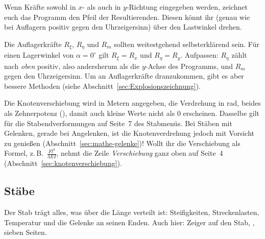 Wenn Kräfte sowohl in $x$- als auch in $y$-Richtung eingegeben werden, zeichnet euch das Programm
den Pfeil der Resultierenden. Diesen könnt ihr (genau wie bei Auflagern positiv gegen den
Uhrzeigersinn) über den Lastwinkel drehen.

Die Auflagerkräfte $R_\xi$, $R_\eta$ und $R_m$ sollten weitestgehend selbsterklärend sein. Für
einen Lagerwinkel von $\alpha = 0^\circ$ gilt $R_\xi = R_x$ und $R_\eta = R_y$. Aufpassen:
$R_\eta$ zählt nach \emph{oben} positiv, also andersherum als die $y$-Achse des Programms, und
$R_m$ gegen den Uhrzeigersinn. Um an Auflagerkräfte dranzukommen, gibt es aber bessere Methoden
(siehe Abschnitt~\ref{sec:Explosionszeichnung}).

Die Knotenverschiebung wird in Metern angegeben, die Verdrehung in rad, beides als
Zehnerpotenz (), damit auch kleine Werte nicht als 0 erscheinen. Dasselbe
gilt für die Stabendverformungen auf Seite~7 des Stabmenüs. Bei Stäben mit Gelenken,
gerade bei Angelenken, ist die Knotenverdrehung jedoch mit Vorsicht zu genießen
(Abschnitt~\ref{sec:mathe-gelenke})! Wollt ihr die Verschiebung als Formel, z.\,B.\
$\frac{F l^3}{3EI}$, nehmt die Zeile \emph{Verschiebung} ganz oben auf Seite~4
(Abschnitt~\ref{sec:knotenverschiebung}).




\subsection{Stäbe}
\label{sec:Eingabe_Stäbe}

Der Stab trägt alles, was über die Länge verteilt ist: Steifigkeiten, Streckenlasten, Temperatur
und die Gelenke an seinen Enden. Auch hier: Zeiger auf den Stab, \taste{Enter}, sieben Seiten.

